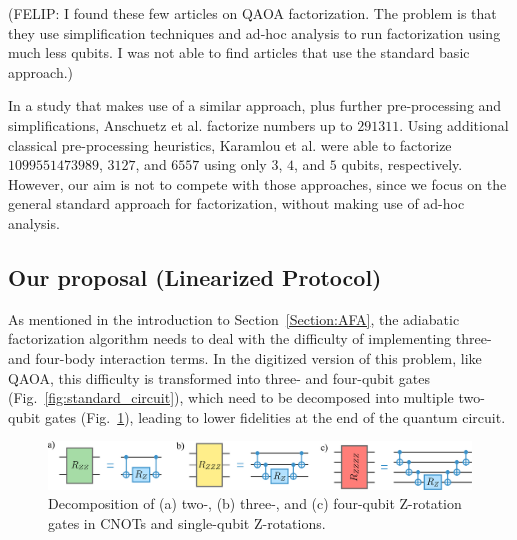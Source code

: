 {\color{red} (FELIP: I found these few articles on QAOA factorization. The problem is that
they use simplification techniques and ad-hoc analysis to run factorization using much less qubits. I 
was not able to find articles that use the standard basic approach.)}

In a study that makes use of a similar approach, plus further pre-processing and simplifications, Anschuetz et al.
factorize numbers up to $291311$. Using additional classical pre-processing heuristics, Karamlou et al. were able to factorize
$1099551473989$, $3127$, and $6557$ using only $3$, $4$, and $5$ qubits, respectively. However, our aim is not to
compete with those approaches, since we focus on the general standard approach for factorization, without making use
of ad-hoc analysis.

\subsection{Our proposal (Linearized Protocol)}
As mentioned in the introduction to Section~\ref{Section:AFA}, the adiabatic factorization algorithm
needs to deal with the difficulty of implementing three- and four-body interaction terms. In the 
digitized version of this problem, like QAOA, this difficulty is transformed into three- and
four-qubit gates (Fig.~\ref{fig:standard_circuit}),
which need to be decomposed into multiple two-qubit gates (Fig.~\ref{fig:gate_decomposition}),
leading to lower fidelities at the end of the quantum circuit.

\begin{figure}[h]
    \centering
    \includegraphics[width=1\textwidth]{02-factorization/figs/gate_decomposition.pdf}
    \caption{Decomposition of (a) two-, (b) three-, and (c) four-qubit Z-rotation gates in CNOTs and
    single-qubit Z-rotations.}
    \label{fig:gate_decomposition}
\end{figure}

